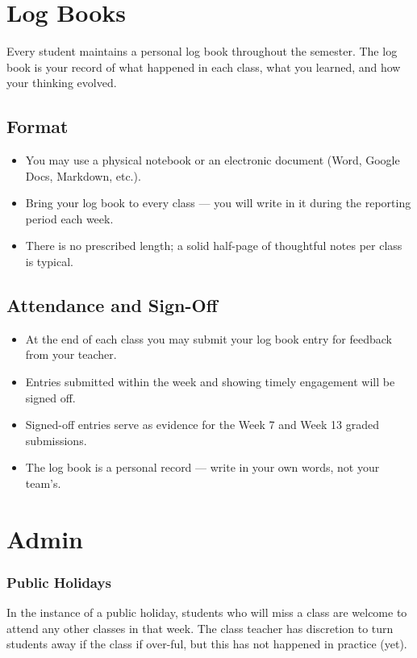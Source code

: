 \documentclass[twoside=false,DIV=14]{scrartcl}
\begin{document}
\section*{Log Books}

Every student maintains a personal log book throughout the semester.  The log book is your record of what happened in each class, what you learned, and how your thinking evolved.

\subsection*{Format}
\begin{itemize}
\itemsep0em
\item You may use a physical notebook or an electronic document (Word, Google Docs, Markdown, etc.).
\item Bring your log book to every class --- you will write in it during the reporting period each week.
\item There is no prescribed length; a solid half-page of thoughtful notes per class is typical.
\end{itemize}

\subsection*{Attendance and Sign-Off}
\begin{itemize}
\itemsep0em
\item At the end of each class you may submit your log book entry for feedback from your teacher.
\item Entries submitted within the week and showing timely engagement will be signed off.
\item Signed-off entries serve as evidence for the Week 7 and Week 13 graded submissions.
\item The log book is a personal record --- write in your own words, not your team's.
\end{itemize}


\section*{Admin}
\subsubsection*{Public Holidays}
In the instance of a public holiday, students who will miss a class are welcome to attend any other classes in that week.  The class teacher has discretion to turn students away if the class if over-ful, but this has not happened in practice (yet).
\end{document}
